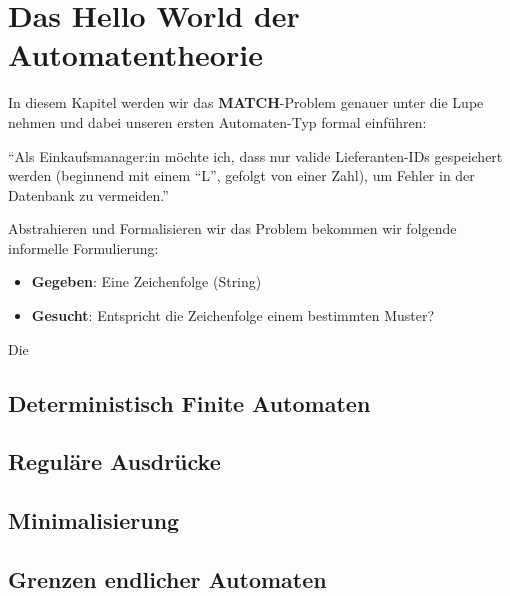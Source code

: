 \chapter{Das Hello World der Automatentheorie}
In diesem Kapitel werden wir das \textbf{MATCH}-Problem genauer unter die Lupe nehmen
und dabei unseren ersten Automaten-Typ formal einführen:
\begin{center}
``Als Einkaufsmanager:in möchte ich, dass nur valide Lieferanten-IDs gespeichert werden
(beginnend mit einem ``L'', gefolgt von einer Zahl),
um Fehler in der Datenbank zu vermeiden.''
\end{center}
Abstrahieren und Formalisieren wir das Problem bekommen wir folgende informelle Formulierung:

\begin{itemize}
\item \textbf{Gegeben}: Eine Zeichenfolge (String)
\item \textbf{Gesucht}: Entspricht die Zeichenfolge einem bestimmten Muster?
\end{itemize}
Die 
\section{Deterministisch Finite Automaten}
\section{Reguläre Ausdrücke}
\section{Minimalisierung}
\section{Grenzen endlicher Automaten}
